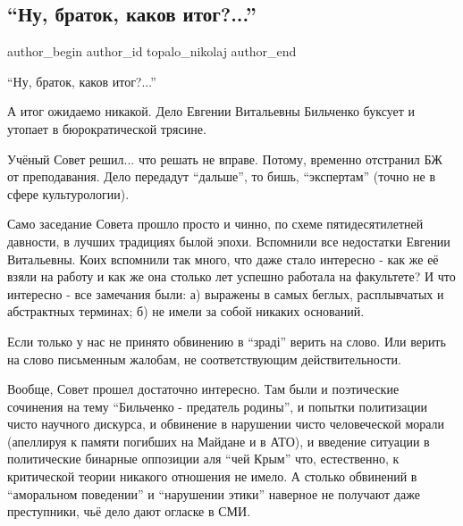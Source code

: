  
 
 
 
 
 
\subsection{\enquote{Ну, браток, каков итог?...}}
\label{sec:04_02_2021.fb.topalo_nikolaj.1.kakov_itog_bilchenko}
\ifcmt
 author_begin
   author_id topalo_nikolaj
 author_end
\fi

\enquote{Ну, браток, каков итог?...}

А итог ожидаемо никакой. Дело Евгении Витальевны Бильченко буксует и утопает в бюрократической трясине. 

Учёный Совет решил... что решать не вправе. Потому, временно отстранил БЖ от
преподавания. Дело передадут \enquote{дальше}, то бишь, \enquote{экспертам} (точно не в сфере
культурологии).

Само заседание Совета прошло просто и чинно, по схеме пятидесятилетней
давности, в лучших традициях былой эпохи. Вспомнили все недостатки Евгении
Витальевны. Коих вспомнили так много, что даже стало интересно - как же её
взяли на работу и как же она столько лет успешно работала на факультете? И что
интересно - все замечания были: а) выражены в самых беглых, расплывчатых и
абстрактных терминах; б) не имели за собой никаких оснований.

Если только у нас не принято обвинению в \enquote{зраді} верить на слово. Или верить на
слово письменным жалобам, не соответствующим действительности. 

Вообще, Совет прошел достаточно интересно. Там были и поэтические сочинения на
тему \enquote{Бильченко - предатель родины}, и попытки политизации чисто научного
дискурса, и обвинение в нарушении чисто человеческой морали (апеллируя к памяти
погибших на Майдане и в АТО), и введение ситуации в политические бинарные
оппозиции аля \enquote{чей Крым} что, естественно, к критической теории никакого
отношения не имело. А столько обвинений в \enquote{аморальном поведении} и \enquote{нарушении
этики} наверное не получают даже преступники, чьё дело дают огласке в СМИ. 

